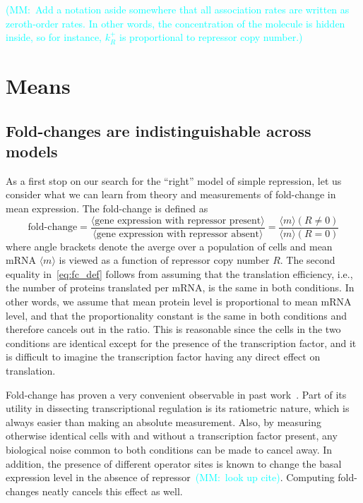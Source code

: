 \documentclass[12pt]{article}%
\newcommand{\mmnote}[1]{\textcolor{cyan}{(MM:~#1)}}
\begin{document}
\mmnote{Add a notation aside somewhere that all association rates are written as zeroth-order rates. In other words, the concentration of the molecule is hidden inside, so for instance, $k_R^+$ is proportional to repressor copy number.}

\section{Means}
\subsection{Fold-changes are indistinguishable across models}
As a first stop on our search for the ``right'' model of simple
repression, let us consider what we can learn from theory and
measurements of fold-change in mean expression. The fold-change is defined as
\begin{equation}
\text{fold-change}
= \frac{\langle \text{gene expression with repressor present} \rangle}
        {\langle \text{gene expression with repressor absent} \rangle}
= \frac{\langle m\rangle(R\ne 0)}{\langle m\rangle(R = 0)}
\label{eq:fc_def}
\end{equation}
where angle brackets denote the averge over a population of cells
and mean mRNA $\langle m\rangle$ is viewed as a function of
repressor copy number $R$.
The second
equality in~\ref{eq:fc_def} follows from assuming that the
translation efficiency, i.e., the number of proteins translated
per mRNA, is the same in both conditions.
In other words, we assume that mean protein level is proportional
to mean mRNA level, and that the proportionality constant is the
same in both conditions and therefore cancels out in the ratio.
This is reasonable since the cells in the two conditions are
identical except for the presence of the transcription factor,
and it is difficult to imagine the transcription factor having
any direct effect on translation.

Fold-change has proven a very convenient observable in past
work~\cite{Garcia2011a, Razo-Mejia2018, Chure2019}.
Part of its utility in dissecting transcriptional regulation is
its ratiometric nature, which is always easier than making an
absolute measurement. Also, by measuring otherwise identical cells
with and without a transcription factor present, any biological
noise common to both conditions can be made to cancel away.
In addition, the presence of different operator sites is known to
change the basal expression level in the absence of
repressor~\mmnote{look up cite}.
Computing fold-changes neatly cancels this effect as well.
\end{document}
